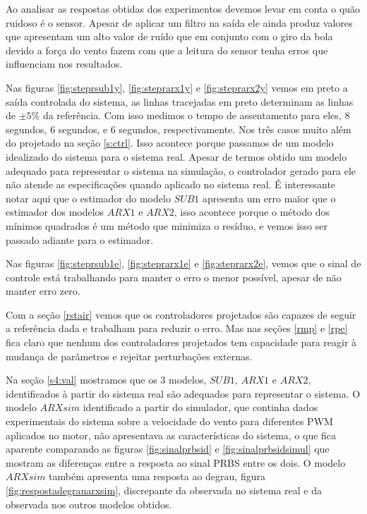 Ao analisar as respostas obtidas dos experimentos devemos levar em conta o quão ruidoso é o sensor. Apesar de aplicar um filtro na saída ele ainda produz valores que apresentam um alto valor de ruído que em conjunto com o giro da bola devido a força do vento fazem com que a leitura do sensor tenha erros que influenciam nos resultados.


Nas figuras \ref{fig:steprsub1y}, \ref{fig:steprarx1y} e \ref{fig:steprarx2y} vemos em preto a saída controlada do sistema, as linhas tracejadas em preto determinam as linhas de $\pm5\%$ da referência. Com isso medimos o tempo de assentamento para eles, 8 segundos, 6 segundos, e 6 segundos, respectivamente. Nos três casos muito além do projetado na seção \ref{s:ctrl}. Isso acontece porque passamos de um modelo idealizado do sistema para o sistema real. Apesar de termos obtido um modelo adequado para representar o sistema na simulação, o controlador gerado para ele não atende as especificações quando aplicado no sistema real. É interessante notar aqui que o estimador do modelo $SUB1$ apresenta um erro maior que o estimador dos modelos $ARX1$ e $ARX2$, isso acontece porque o método dos mínimos quadrados é um método que minimiza o resíduo, e vemos isso ser passado adiante para o estimador.


Nas figuras \ref{fig:steprsub1e}, \ref{fig:steprarx1e} e \ref{fig:steprarx2e}, vemos que o sinal de controle está trabalhando para manter o erro o menor possível, apesar de não manter erro zero.


Com a seção \ref{rstair} vemos que os controladores projetados são capazes de seguir a referência dada e trabalham para reduzir o erro. Mas nas seções \ref{rmp} e \ref{rpe} fica claro que nenhum dos controladores projetados tem capacidade para reagir à mudança de parâmetros e rejeitar perturbações externas. 


Na seção \ref{s4:val} mostramos que os 3 modelos, $SUB1$, $ARX1$ e $ARX2$, identificados à partir do sistema real são adequados para representar o sistema. O modelo $ARXsim$ identificado a partir do simulador, que continha dados experimentais do sistema sobre a velocidade do vento para diferentes PWM aplicados no motor, não apresentava as características do sistema, o que fica aparente comparando as figuras \ref{fig:sinalprbsid} e \ref{fig:sinalprbsidsimul} que mostram as diferenças entre a resposta ao sinal PRBS entre os dois. O modelo $ARXsim$ também apresenta uma resposta ao degrau, figura \ref{fig:respostadegrauarxsim}, discrepante da observada no sistema real e da observada nos outros modelos obtidos.


